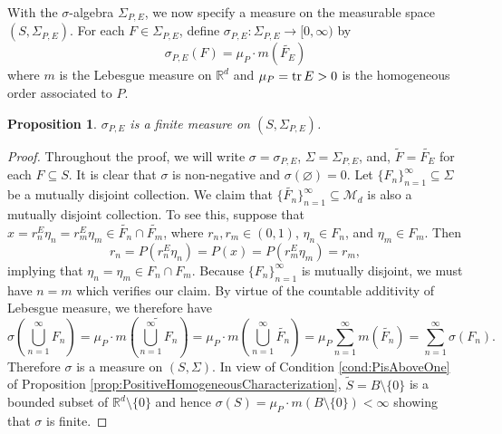 \documentclass[11pt, letter]{book}
\newtheorem{proposition}[theorem]{Proposition}
\begin{document}
\noindent With the $\sigma$-algebra $\Sigma_{P,E}$, we now specify a measure on the measurable space $(S,\Sigma_{P,E})$. For each $F\in \Sigma_{P,E}$, define $\sigma_{P,E}: \Sigma_{P,E} \to [0,\infty)$ by 
\begin{equation*}
\sigma_{P,E}(F)=\mu_P\cdot m(\widetilde{F_E})
\end{equation*}
where $m$ is the Lebesgue measure on $\mathbb{R}^d$ and $\mu_P=\tr E>0$ is the homogeneous order associated to $P$. 
\begin{framed}
\begin{proposition}\label{prop:sigmaisameaure}
$\sigma_{P,E}$ is a finite measure on $(S,\Sigma_{P,E})$.
\end{proposition}
\end{framed}
\begin{proof}
\noindent Throughout the proof, we will write $\sigma=\sigma_{P,E}$, $\Sigma=\Sigma_{P,E}$, and, $\widetilde{F}=\widetilde{F_E}$ for each $F\subseteq S$. It is clear that $\sigma$ is non-negative and $\sigma(\varnothing)=0$. Let $\{ F_n  \}^\infty_{n=1} \subseteq \Sigma $ be a mutually disjoint collection. We claim that $\{ \widetilde{F_n} \}_{n=1}^\infty\subseteq\mathcal{M}_d$ is also a mutually disjoint collection. To see this, suppose that $x = r_n^E \eta_n = r_m^E \eta_m\in \widetilde{F_n}\cap\widetilde{F_m}$, where $r_n,r_m \in (0,1)$, $\eta_n \in F_n$, and $\eta_m \in F_m $. Then
\begin{equation*}
    r_n = P(r_n^E \eta_n) = P(x) = P(r_m^E \eta_m) = r_m,
\end{equation*}
implying that $\eta_n = \eta_m\in F_n\cap F_m$. Because $\{F_n\}_{n=1}^\infty$ is mutually disjoint, we must have $n=m$ which verifies our claim. By virtue of the countable additivity of Lebesgue measure, we therefore have
\begin{equation*}
\sigma\left(\bigcup_{n=1}^\infty F_n\right)
    = \mu_P\cdot m\left( \widetilde{\bigcup^\infty_{n=1} F_n } \right)=\mu_P\cdot m\left( \bigcup^\infty_{n=1}\widetilde{F_n} \right)
    = \mu_P\sum^\infty_{n=1} m(\widetilde{F_n})
    = \sum^\infty_{n=1}\sigma(F_n).
\end{equation*}
Therefore $\sigma$ is a measure on $(S,\Sigma)$. In view of Condition \ref{cond:PisAboveOne} of Proposition \ref{prop:PositiveHomogeneousCharacterization}, $\widetilde{S}=B\setminus\{0\}$ is a bounded subset of $\mathbb{R}^d\setminus\{0\}$ and hence $\sigma(S)=\mu_P\cdot m(B\setminus\{0\})<\infty$ showing that $\sigma$ is finite.
\end{proof}
\end{document}
